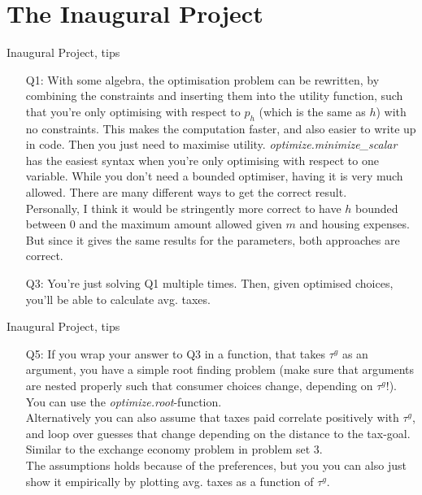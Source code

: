 \documentclass[10pt,danish,t,10pt]{beamer}
\newcommand{\code}[1]{\textit{#1}} %
\begin{document}
\section{The Inaugural Project}
\begin{frame}{Inaugural Project, tips}
    \begin{itemize}
        \item  [Q1:] With some algebra, the optimisation problem can be rewritten, by combining the constraints and inserting them into the utility function, such that you're only optimising with respect to $p_h$ (which is the same as $h$) with no constraints. This makes the computation faster, and also easier to write up in code. Then you just need to maximise utility. \code{optimize.minimize\_scalar} has the easiest syntax when you're only optimising with respect to one variable. \newline
        While you don't need a bounded optimiser, having it is very much allowed. There are many different ways to get the correct result. \\
        Personally, I think it would be stringently more correct to have $h$ bounded between 0 and the maximum amount allowed given $m$ and housing expenses. But since it gives the same results for the parameters, both approaches are correct.
        \item [Q3:] You're just solving Q1 multiple times. Then, given optimised choices, you'll be able to calculate avg. taxes.
    \end{itemize}  
\end{frame}

\begin{frame}{Inaugural Project, tips}
    \begin{itemize}
        \item [Q5:] If you wrap your answer to Q3 in a function, that takes  $\tau ^{g}$ as an argument, you have a simple root finding problem (make sure that arguments are nested properly such that consumer choices change, depending on $\tau ^{g}$!). You can use the \code{optimize.root}-function. \\
        Alternatively you can also assume that taxes paid correlate positively with $\tau ^{g}$, and loop over guesses that change depending on the distance to the tax-goal. Similar to the exchange economy problem in problem set 3. \\
        The assumptions holds because of the preferences, but you you can also just show it empirically by plotting avg. taxes as a function of $\tau^{g}$.
    \end{itemize}
    
\end{frame}
\end{document}

